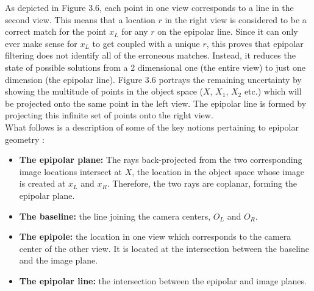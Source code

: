 \documentclass[12pt,a4paper,twoside,openright]{report}
\begin{document}
\linebreak
As depicted in Figure 3.6, each point in one view corresponds to a line in the second view. This means that a location $r$ in the right view is considered to be a correct match for the point $x_{L}$ for any $r$ on the epipolar line. Since it can only ever make sense for $x_{L}$ to get coupled with a unique $r$, this proves that epipolar filtering does not identify all of the erroneous matches. Instead, it reduces the state of possible solutions from a 2 dimensional one (the entire view) to just one dimension (the epipolar line). Figure 3.6 portrays the remaining uncertainty by showing the multitude of points in the object space ($X$, $X_{1}$, $X_{2}$ etc.) which will be projected onto the same point in the left view. The epipolar line is formed by projecting this infinite set of points onto the right view.\\
\linebreak
What follows is a description of some of the key notions pertaining to epipolar geometry \cite[chapter~9]{Hartley+2003}:
\begin{itemize}
\item {\bf{The epipolar plane:}} The rays back-projected from the two corresponding image locations intersect at $X$, the location in the object space whose image is created at $x_{L}$ and $x_{R}$. Therefore, the two rays are coplanar, forming the epipolar plane.  
\item {\bf{The baseline:}} the line joining the camera centers, $O_{L}$ and $O_{R}$.
\item {\bf{The epipole:}} the location in one view which corresponds to the camera center of the other view. It is located at the intersection between the baseline and the image plane. 
\item {\bf{The epipolar line:}} the intersection between the epipolar and image planes. 
\end{itemize}
\end{document}

